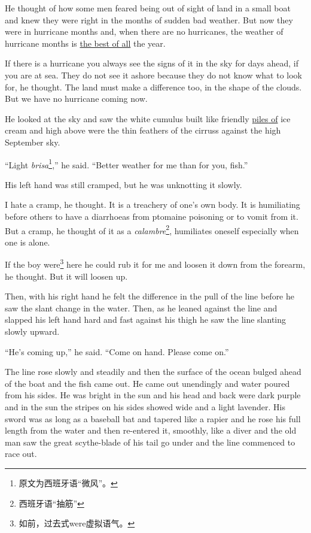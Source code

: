 \documentclass[fontset=ubuntu,zihao=-4]{ctexrep}
\begin{document}
He thought of how some men \gls{feared} being out of sight of land in a
small boat and knew they were right in the months of sudden bad weather. But
now they were in \gls{hurricane} months and, when there are no hurricanes, the
weather of hurricane months is \uline{the best of all} the year.

If there is a hurricane you always see the signs of it in the sky for days
ahead, if you are at sea. They do not see it \gls{ashore} because they do not know
what to look for, he thought. The land must make a difference too, in the
shape of the clouds. But we have no hurricane coming now.

He looked at the sky and saw the white \gls{cumulus} built like friendly
\uline{\glspl{pile} of} ice cream and high above were the thin \glspl{feather} of
the \glspl{cirrus} against the high September sky.

``Light \emph{brisa}\footnote{原文为西班牙语“微风”。},'' he said. ``Better
weather for me than for you, fish.''

His left hand was still cramped, but he was \gls{unknotting} it slowly.

I hate a cramp, he thought. It is a treachery of one's own body. It is
\gls{humiliating} before others to have a \glspl{diarrhoea} from
\gls{ptomaine} poisoning or to \gls{vomit} from it. But a cramp, he
thought of it as a \emph{calambre}\footnote{西班牙语“抽筋”}, humiliates oneself
especially when one is alone.

If the boy were\footnote{如前，过去式were虚拟语气。} here he could \gls{rub}
it for me and \gls{loosen} it down from the \gls{forearm}, he thought. But
it will loosen up.

Then, with his right hand he felt the difference in the pull of the line
before he saw the slant change in the water. Then, as he leaned against the
line and slapped his left hand hard and fast against his \gls{thigh} he saw the
line slanting slowly upward.

``He's coming up,'' he said. ``Come on hand. Please come on.''

The line rose slowly and steadily and then the surface of the ocean
\gls{bulged} ahead of the boat and the fish came out. He came out
\gls{unendingly} and water \gls{poured} from his sides. He was bright in the
sun and his head and back were dark purple and in the sun the stripes on his
sides showed wide and a light lavender. His sword was as long as a baseball
\gls{bat} and \gls{tapered} like a rapier and he rose his full length from
the water and then re-entered it, \gls{smoothly}, like a diver and the old
man saw the great scythe-blade of his tail go under and the line commenced
to race out.
\end{document}
